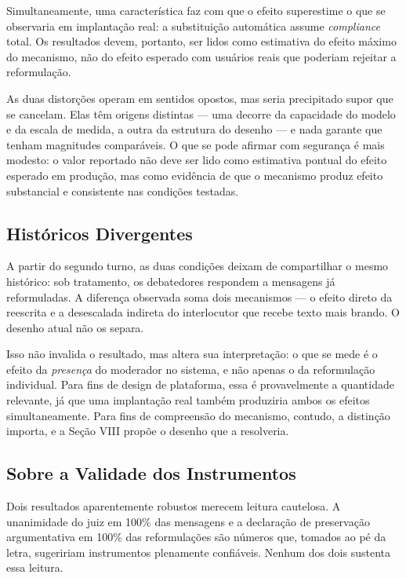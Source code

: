 \documentclass[conference]{IEEEtran} \IEEEoverridecommandlockouts %
\begin{document}
Simultaneamente, uma característica faz com que o efeito superestime o que se
observaria em implantação real: a substituição automática assume
\textit{compliance} total. Os resultados devem, portanto, ser lidos como
estimativa do efeito máximo do mecanismo, não do efeito esperado com usuários
reais que poderiam rejeitar a reformulação.

As duas distorções operam em sentidos opostos, mas seria precipitado supor que
se cancelam. Elas têm origens distintas — uma decorre da capacidade do modelo e
da escala de medida, a outra da estrutura do desenho — e nada garante que
tenham magnitudes comparáveis. O que se pode afirmar com segurança é mais
modesto: o valor reportado não deve ser lido como estimativa pontual do efeito
esperado em produção, mas como evidência de que o mecanismo produz efeito
substancial e consistente nas condições testadas.

\subsection{Históricos Divergentes}

A partir do segundo turno, as duas condições deixam de compartilhar o mesmo
histórico: sob tratamento, os debatedores respondem a mensagens já reformuladas.
A diferença observada soma dois mecanismos — o efeito direto da reescrita e a
desescalada indireta do interlocutor que recebe texto mais brando. O desenho
atual não os separa.

Isso não invalida o resultado, mas altera sua interpretação: o que se mede é o
efeito da \textit{presença} do moderador no sistema, e não apenas o da
reformulação individual. Para fins de design de plataforma, essa é
provavelmente a quantidade relevante, já que uma implantação real também
produziria ambos os efeitos simultaneamente. Para fins de compreensão do
mecanismo, contudo, a distinção importa, e a Seção VIII propõe o desenho que a
resolveria.

\subsection{Sobre a Validade dos Instrumentos}

Dois resultados aparentemente robustos merecem leitura cautelosa. A
unanimidade do juiz em 100\% das mensagens e a declaração de preservação
argumentativa em 100\% das reformulações são números que, tomados ao pé da
letra, sugeririam instrumentos plenamente confiáveis. Nenhum dos dois sustenta
essa leitura.
\end{document}
